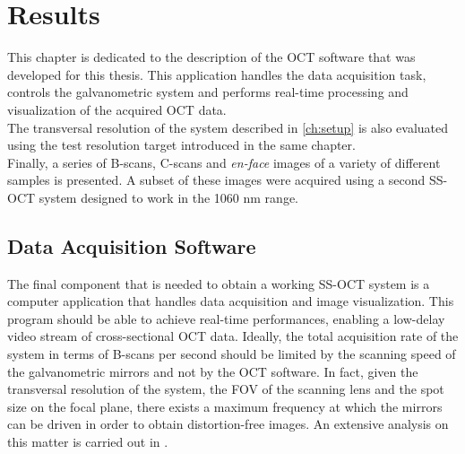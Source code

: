 
\chapter{Results} %
\label{ch:results} %

This chapter is dedicated to the description of the OCT software that was developed for this thesis. This application handles the data acquisition task, controls the galvanometric system and performs real-time processing and visualization of the acquired OCT data. \\

\noindent The transversal resolution of the system described in \autoref{ch:setup} is also evaluated using the test resolution target introduced in the same chapter. \\

\noindent Finally, a series of B-scans, C-scans and \emph{en-face} images of a variety of different samples is presented. A subset of these images were acquired using a second SS-OCT system designed to work in the 1060 nm range. 



\section{Data Acquisition Software}

The final component that is needed to obtain a working SS-OCT system is a computer application that handles data acquisition and image visualization. This program should be able to achieve real-time performances, enabling a low-delay video stream of cross-sectional OCT data. Ideally, the total acquisition rate of the system in terms of B-scans per second should be limited by the scanning speed of the galvanometric mirrors and not by the OCT software. In fact, given the transversal resolution of the system, the FOV of the scanning lens and the spot size on the focal plane, there exists a maximum frequency at which the mirrors can be driven in order to obtain distortion-free images. An extensive analysis on this matter is carried out in \cite{Calabrese2017}. \\



